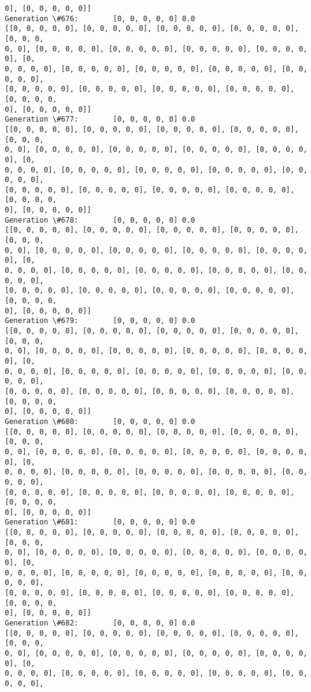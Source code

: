 \documentclass[11pt]{article}
\begin{document}
\begin{Verbatim}[commandchars=\\\{\}]
0], [0, 0, 0, 0, 0]]
Generation \#676:        [0, 0, 0, 0, 0] 0.0
[[0, 0, 0, 0, 0], [0, 0, 0, 0, 0], [0, 0, 0, 0, 0], [0, 0, 0, 0, 0], [0, 0, 0,
0, 0], [0, 0, 0, 0, 0], [0, 0, 0, 0, 0], [0, 0, 0, 0, 0], [0, 0, 0, 0, 0], [0,
0, 0, 0, 0], [0, 0, 0, 0, 0], [0, 0, 0, 0, 0], [0, 0, 0, 0, 0], [0, 0, 0, 0, 0],
[0, 0, 0, 0, 0], [0, 0, 0, 0, 0], [0, 0, 0, 0, 0], [0, 0, 0, 0, 0], [0, 0, 0, 0,
0], [0, 0, 0, 0, 0]]
Generation \#677:        [0, 0, 0, 0, 0] 0.0
[[0, 0, 0, 0, 0], [0, 0, 0, 0, 0], [0, 0, 0, 0, 0], [0, 0, 0, 0, 0], [0, 0, 0,
0, 0], [0, 0, 0, 0, 0], [0, 0, 0, 0, 0], [0, 0, 0, 0, 0], [0, 0, 0, 0, 0], [0,
0, 0, 0, 0], [0, 0, 0, 0, 0], [0, 0, 0, 0, 0], [0, 0, 0, 0, 0], [0, 0, 0, 0, 0],
[0, 0, 0, 0, 0], [0, 0, 0, 0, 0], [0, 0, 0, 0, 0], [0, 0, 0, 0, 0], [0, 0, 0, 0,
0], [0, 0, 0, 0, 0]]
Generation \#678:        [0, 0, 0, 0, 0] 0.0
[[0, 0, 0, 0, 0], [0, 0, 0, 0, 0], [0, 0, 0, 0, 0], [0, 0, 0, 0, 0], [0, 0, 0,
0, 0], [0, 0, 0, 0, 0], [0, 0, 0, 0, 0], [0, 0, 0, 0, 0], [0, 0, 0, 0, 0], [0,
0, 0, 0, 0], [0, 0, 0, 0, 0], [0, 0, 0, 0, 0], [0, 0, 0, 0, 0], [0, 0, 0, 0, 0],
[0, 0, 0, 0, 0], [0, 0, 0, 0, 0], [0, 0, 0, 0, 0], [0, 0, 0, 0, 0], [0, 0, 0, 0,
0], [0, 0, 0, 0, 0]]
Generation \#679:        [0, 0, 0, 0, 0] 0.0
[[0, 0, 0, 0, 0], [0, 0, 0, 0, 0], [0, 0, 0, 0, 0], [0, 0, 0, 0, 0], [0, 0, 0,
0, 0], [0, 0, 0, 0, 0], [0, 0, 0, 0, 0], [0, 0, 0, 0, 0], [0, 0, 0, 0, 0], [0,
0, 0, 0, 0], [0, 0, 0, 0, 0], [0, 0, 0, 0, 0], [0, 0, 0, 0, 0], [0, 0, 0, 0, 0],
[0, 0, 0, 0, 0], [0, 0, 0, 0, 0], [0, 0, 0, 0, 0], [0, 0, 0, 0, 0], [0, 0, 0, 0,
0], [0, 0, 0, 0, 0]]
Generation \#680:        [0, 0, 0, 0, 0] 0.0
[[0, 0, 0, 0, 0], [0, 0, 0, 0, 0], [0, 0, 0, 0, 0], [0, 0, 0, 0, 0], [0, 0, 0,
0, 0], [0, 0, 0, 0, 0], [0, 0, 0, 0, 0], [0, 0, 0, 0, 0], [0, 0, 0, 0, 0], [0,
0, 0, 0, 0], [0, 0, 0, 0, 0], [0, 0, 0, 0, 0], [0, 0, 0, 0, 0], [0, 0, 0, 0, 0],
[0, 0, 0, 0, 0], [0, 0, 0, 0, 0], [0, 0, 0, 0, 0], [0, 0, 0, 0, 0], [0, 0, 0, 0,
0], [0, 0, 0, 0, 0]]
Generation \#681:        [0, 0, 0, 0, 0] 0.0
[[0, 0, 0, 0, 0], [0, 0, 0, 0, 0], [0, 0, 0, 0, 0], [0, 0, 0, 0, 0], [0, 0, 0,
0, 0], [0, 0, 0, 0, 0], [0, 0, 0, 0, 0], [0, 0, 0, 0, 0], [0, 0, 0, 0, 0], [0,
0, 0, 0, 0], [0, 0, 0, 0, 0], [0, 0, 0, 0, 0], [0, 0, 0, 0, 0], [0, 0, 0, 0, 0],
[0, 0, 0, 0, 0], [0, 0, 0, 0, 0], [0, 0, 0, 0, 0], [0, 0, 0, 0, 0], [0, 0, 0, 0,
0], [0, 0, 0, 0, 0]]
Generation \#682:        [0, 0, 0, 0, 0] 0.0
[[0, 0, 0, 0, 0], [0, 0, 0, 0, 0], [0, 0, 0, 0, 0], [0, 0, 0, 0, 0], [0, 0, 0,
0, 0], [0, 0, 0, 0, 0], [0, 0, 0, 0, 0], [0, 0, 0, 0, 0], [0, 0, 0, 0, 0], [0,
0, 0, 0, 0], [0, 0, 0, 0, 0], [0, 0, 0, 0, 0], [0, 0, 0, 0, 0], [0, 0, 0, 0, 0],

\end{Verbatim}
\end{document}
